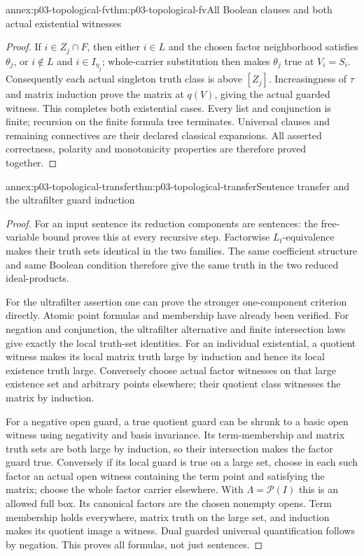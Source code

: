 \begin{annexitem}{annex:p03-topological-fv}{thm:p03-topological-fv}{All Boolean clauses and both actual existential witnesses}
\begin{proof}
If \(i\in Z_j\cap F\), then either \(i\in L\) and the chosen
factor neighborhood satisfies \(\theta_j\), or \(i\notin L\)
and \(i\in I_{\eta_j}\); whole-carrier substitution then makes
\(\theta_j\) true at \(V_i=S_i\). Consequently each actual
singleton truth class is above \([Z_j]\). Increasingness of \(\tau\)
and matrix induction prove the matrix at \(q(V)\), giving the
actual guarded witness. This completes both existential cases.
Every list and conjunction is finite; recursion on the finite formula
tree terminates. Universal clauses and remaining connectives are their
declared classical expansions. All asserted correctness, polarity and
monotonicity properties are therefore proved together.
\end{proof}
\end{annexitem}

\begin{annexitem}{annex:p03-topological-transfer}{thm:p03-topological-transfer}{Sentence transfer and the ultrafilter guard induction}
\begin{proof}
For an input sentence its reduction components are sentences: the
free-variable bound proves this at every recursive step. Factorwise
\(L_t\)-equivalence makes their truth sets identical in the two families.
The same coefficient structure and same Boolean condition therefore
give the same truth in the two reduced ideal-products.

For the ultrafilter assertion one can prove the stronger one-component
criterion directly. Atomic point formulas and membership have already
been verified. For negation and conjunction, the ultrafilter alternative
and finite intersection laws give exactly the local truth-set identities.
For an individual existential, a quotient witness makes its local matrix
truth large by induction and hence its local existence truth large.
Conversely choose actual factor witnesses on that large existence set and
arbitrary points elsewhere; their quotient class witnesses the matrix by
induction.

For a negative open guard, a true quotient guard can be shrunk to a
basic open witness using negativity and basis invariance. Its term-membership
and matrix truth sets are both large by induction, so their intersection
makes the factor guard true. Conversely if its local guard is true on a
large set, choose in each such factor an actual open witness containing
the term point and satisfying the matrix; choose the whole factor carrier
elsewhere. With \(\Lambda=\mathcal P(I)\) this is an allowed full box.
Its canonical factors are the chosen nonempty opens. Term membership
holds everywhere, matrix truth on the large set, and induction makes its
quotient image a witness. Dual guarded universal quantification follows
by negation. This proves all formulas, not just sentences.


\end{proof}
\end{annexitem}
